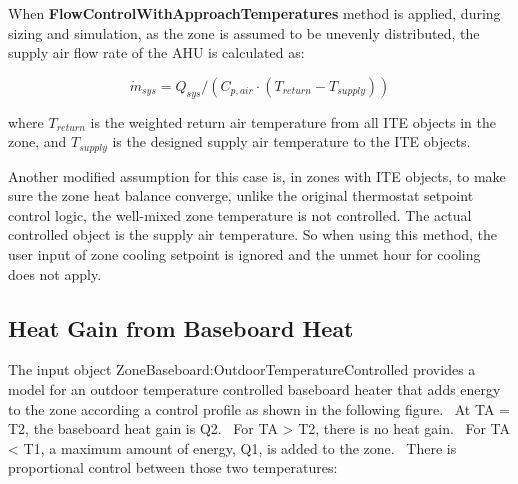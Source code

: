 When \textbf{FlowControlWithApproachTemperatures} method is applied, during sizing and simulation, as the zone is assumed to be unevenly distributed, the supply air flow rate of the AHU is calculated as:

\begin{equation}
{\dot m_{sys}} = {Q_{sys}}/({C_{p,air}} \cdot ({T_{return}} - {T_{supply}}))
\end{equation}

where $T_{return}$ is the weighted return air temperature from all ITE objects in the zone, and $T_{supply}$ is the designed supply air temperature to the ITE objects.

Another modified assumption for this case is, in zones with ITE objects, to make sure the zone heat balance converge, unlike the original thermostat setpoint control logic, the well-mixed zone temperature is not controlled. The actual controlled object is the supply air temperature. So when using this method, the user input of zone cooling setpoint is ignored and the unmet hour for cooling does not apply.

\subsection{Heat Gain from Baseboard Heat}\label{heat-gain-from-baseboard-heat}

The input object ZoneBaseboard:OutdoorTemperatureControlled provides a model for an outdoor temperature controlled baseboard heater that adds energy to the zone according a control profile as shown in the following figure.~ At TA = T2, the baseboard heat gain is Q2.~ For TA \textgreater{} T2, there is no heat gain.~ For TA \textless{} T1, a maximum amount of energy, Q1, is added to the zone.~ There is proportional control between those two temperatures:

